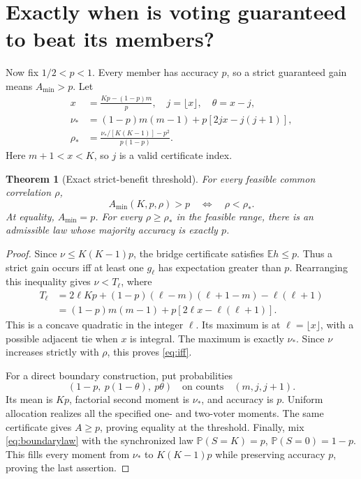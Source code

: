 \documentclass{article}
\newtheorem{theorem}{Theorem}
\newcommand{\Prb}{\mathbb P}
\newcommand{\Ex}{\mathbb E}
\begin{document}
\clearpage
\section{Exactly when is voting guaranteed to beat its members?}
Now fix $1/2<p<1$. Every member has accuracy $p$, so a strict guaranteed gain means $A_{\min}>p$. Let
\begin{align}
 x&=\frac{Kp-(1-p)m}{p},\quad j=\lfloor x\rfloor,\quad\theta=x-j,\label{eq:x}\\
 \nu_*&=(1-p)m(m-1)+p[2jx-j(j+1)],\label{eq:nustar}\\
 \rho_*&=\frac{\nu_*/[K(K-1)]-p^2}{p(1-p)}.\label{eq:rhostar}
\end{align}
Here $m+1<x<K$, so $j$ is a valid certificate index.
\begin{theorem}[Exact strict-benefit threshold]\label{thm:threshold}
For every feasible common correlation $\rho$,
\begin{equation}\label{eq:iff}
 \boxed{\quad A_{\min}(K,p,\rho)>p\quad\Longleftrightarrow\quad\rho<\rho_*.\quad}
\end{equation}
At equality, $A_{\min}=p$. For every $\rho\ge\rho_*$ in the feasible range, there is an admissible law whose majority accuracy is exactly $p$.
\end{theorem}
\begin{proof}
Since $\nu\le K(K-1)p$, the bridge certificate satisfies $\Ex h\le p$. Thus a strict gain occurs iff at least one $g_\ell$ has expectation greater than $p$. Rearranging this inequality gives $\nu<T_\ell$, where
\begin{align}
 T_\ell&=2\ell Kp+(1-p)(\ell-m)(\ell+1-m)-\ell(\ell+1)\nonumber\\
 &=(1-p)m(m-1)+p[2\ell x-\ell(\ell+1)].\label{eq:T}
\end{align}
This is a concave quadratic in the integer $\ell$. Its maximum is at $\ell=\lfloor x\rfloor$, with a possible adjacent tie when $x$ is integral. The maximum is exactly $\nu_*$. Since $\nu$ increases strictly with $\rho$, this proves \eqref{eq:iff}.

For a direct boundary construction, put probabilities
\begin{equation}\label{eq:boundarylaw}
 (1-p,\ p(1-\theta),\ p\theta)\quad\text{on counts}\quad(m,j,j+1).
\end{equation}
Its mean is $Kp$, factorial second moment is $\nu_*$, and accuracy is $p$. Uniform allocation realizes all the specified one- and two-voter moments. The same certificate gives $A\ge p$, proving equality at the threshold. Finally, mix \eqref{eq:boundarylaw} with the synchronized law $\Prb(S=K)=p$, $\Prb(S=0)=1-p$. This fills every moment from $\nu_*$ to $K(K-1)p$ while preserving accuracy $p$, proving the last assertion.
\end{proof}
\end{document}
